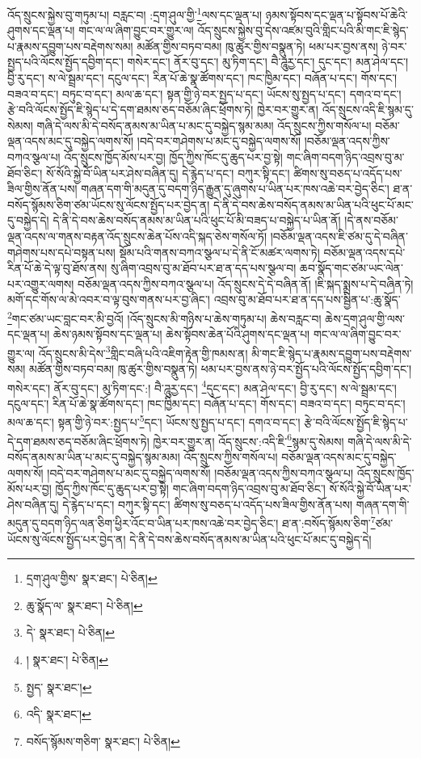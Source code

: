 འོད་སྲུངས་སྐྱེས་བུ་གཏུམ་པ། བརླང་བ། :དྲག་ཤུལ་གྱི་\footnote{དྲག་ཤུལ་གྱིས་  སྣར་ཐང་།  པེ་ཅིན། }ལས་དང་ལྡན་པ། ཉམས་སྟོབས་དང་ལྡན་པ་སྟོབས་པོ་ཆེའི་ཤུགས་དང་ལྡན་པ། གང་ལ་ལ་ཞིག་བྱུང་བར་གྱུར་ལ། འོད་སྲུངས་སྐྱེས་བུ་དེས་འཛམ་བུའི་གླིང་པའི་མི་གང་ཇི་སྙེད་པ་རྣམས་དབྱུག་པས་བརྡེགས་སམ། མཚོན་གྱིས་བཏབ་བམ། ཁུ་ཚུར་གྱིས་བསྣུན་ཏེ། ཕམ་པར་བྱས་ནས། ཉེ་བར་སྤྱད་པའི་ལོངས་སྤྱོད་དབྱིག་དང་། གསེར་དང་། ནོར་བུ་དང་། མུ་ཏིག་དང་། བཻ་ཌཱུརྱ་དང་། དུང་དང་། མན་ཤེལ་དང་། བྱི་རུ་དང་། ས་ལེ་སྦྲམ་དང་། དངུལ་དང་། རིན་པོ་ཆེ་སྣ་ཚོགས་དང་། ཁང་ཁྱིམ་དང་། བཞོན་པ་དང་། གོས་དང་། བཟའ་བ་དང་། བཏུང་བ་དང་། མལ་ཆ་དང་། སྟན་གྱི་ཉེ་བར་སྤྱད་པ་དང་། ཡོངས་སུ་སྤྱད་པ་དང་། དགའ་བ་དང་། རྩེ་བའི་ལོངས་སྤྱོད་ཇི་སྙེད་པ་དེ་དག་ཐམས་ཅད་བཅོམ་ཞིང་ཕྲོགས་ཏེ། ཁྱེར་བར་གྱུར་ན། འོད་སྲུངས་འདི་ཇི་སྙམ་དུ་སེམས། གཞི་དེ་ལས་མི་དེ་བསོད་ནམས་མ་ཡིན་པ་མང་དུ་བསྐྱེད་སྙམ་མམ། འོད་སྲུངས་ཀྱིས་གསོལ་པ། བཅོམ་ལྡན་འདས་མང་དུ་བསྐྱེད་ལགས་སོ། །བདེ་བར་གཤེགས་པ་མང་དུ་བསྐྱེད་ལགས་སོ། །བཅོམ་ལྡན་འདས་ཀྱིས་བཀའ་སྩལ་པ། འོད་སྲུངས་ཁྱོད་མོས་པར་བྱ། ཁྱོད་ཀྱིས་ཁོང་དུ་ཆུད་པར་བྱ་སྟེ། གང་ཞིག་བདག་ཉིད་འབྲས་བུ་མ་ཐོབ་ཅིང་། སོ་སོའི་སྐྱེ་བོ་ཡིན་པར་ཤེས་བཞིན་དུ། དེ་རྙེད་པ་དང་། བཀུར་སྟི་དང་། ཚིགས་སུ་བཅད་པ་འདོད་པས་ཟིལ་གྱིས་ནོན་པས། གཞན་དག་གི་མདུན་དུ་བདག་ཉིད་རྒྱུན་དུ་ཞུགས་པ་ཡིན་པར་ཁས་འཆེ་བར་བྱེད་ཅིང་། ཐ་ན་བསོད་སྙོམས་ཅིག་ཙམ་ཡོངས་སུ་ལོངས་སྤྱོད་པར་བྱེད་ན། དེ་ནི་དེ་བས་ཆེས་བསོད་ནམས་མ་ཡིན་པའི་ཕུང་པོ་མང་དུ་བསྐྱེད་དེ། དེ་ནི་དེ་བས་ཆེས་བསོད་ནམས་མ་ཡིན་པའི་ཕུང་པོ་མི་བཟད་པ་བསྐྱེད་པ་ཡིན་ནོ། །དེ་ནས་བཅོམ་ལྡན་འདས་ལ་གནས་བརྟན་འོད་སྲུངས་ཆེན་པོས་འདི་སྐད་ཅེས་གསོལ་ཏོ། །བཅོམ་ལྡན་འདས་ཇི་ཙམ་དུ་དེ་བཞིན་གཤེགས་པས་དཔེ་བསྟན་པས། སྡོམ་པའི་གནས་བཀའ་སྩལ་པ་དེ་ནི་ངོ་མཚར་ལགས་ཏེ། བཅོམ་ལྡན་འདས་དཔེ་རིན་པོ་ཆེ་དེ་ལྟ་བུ་ཐོས་ནས། སུ་ཞིག་འབྲས་བུ་མ་ཐོབ་པར་ཐ་ན་དད་པས་སྩལ་བ། ཆབ་སྣོད་གང་ཙམ་ཡང་ལེན་པར་འགྱུར་ལགས། བཅོམ་ལྡན་འདས་ཀྱིས་བཀའ་སྩལ་པ། འོད་སྲུངས་དེ་དེ་བཞིན་ནོ། །ཇི་སྐད་སྨྲས་པ་དེ་བཞིན་ཏེ། མགོ་དང་གོས་ལ་མེ་འབར་བ་ལྟ་བུས་གནས་པར་བྱ་ཞིང་། འབྲས་བུ་མ་ཐོབ་པར་ཐ་ན་དད་པས་སྦྱིན་པ་:ཆུ་སྣོད་\footnote{ཆུ་སྣོད་ལ་  སྣར་ཐང་།  པེ་ཅིན། }གང་ཙམ་ཡང་བླང་བར་མི་བྱའོ། །འོད་སྲུངས་མི་གཉིས་པ་ཆེས་གཏུམ་པ། ཆེས་བརླང་བ། ཆེས་དྲག་ཤུལ་གྱི་ལས་དང་ལྡན་པ། ཆེས་ཉམས་སྟོབས་དང་ལྡན་པ། ཆེས་སྟོབས་ཆེན་པོའི་ཤུགས་དང་ལྡན་པ། གང་ལ་ལ་ཞིག་བྱུང་བར་གྱུར་ལ། འོད་སྲུངས་མི་དེས་\footnote{དེ་  སྣར་ཐང་།  པེ་ཅིན། }གླིང་བཞི་པའི་འཇིག་རྟེན་གྱི་ཁམས་ན། མི་གང་ཇི་སྙེད་པ་རྣམས་དབྱུག་པས་བརྡེགས་སམ། མཚོན་གྱིས་བཏབ་བམ། ཁུ་ཚུར་གྱིས་བསྣུན་ཏེ། ཕམ་པར་བྱས་ནས་ཉེ་བར་སྤྱོད་པའི་ལོངས་སྤྱོད་དབྱིག་དང་། གསེར་དང་། ནོར་བུ་དང་། མུ་ཏིག་དང་:། བཻ་ཌཱུརྱ་དང་། \footnote{།    སྣར་ཐང་།  པེ་ཅིན། }དུང་དང་། མན་ཤེལ་དང་། བྱི་རུ་དང་། ས་ལེ་སྦྲམ་དང་། དངུལ་དང་། རིན་པོ་ཆེ་སྣ་ཚོགས་དང་། ཁང་ཁྱིམ་དང་། བཞོན་པ་དང་། གོས་དང་། བཟའ་བ་དང་། བཏུང་བ་དང་། མལ་ཆ་དང་། སྟན་གྱི་ཉེ་བར་:སྤྱད་པ་\footnote{སྤྱད་  སྣར་ཐང་། }དང་། ཡོངས་སུ་སྤྱད་པ་དང་། དགའ་བ་དང་། རྩེ་བའི་ལོངས་སྤྱོད་ཇི་སྙེད་པ་དེ་དག་ཐམས་ཅད་བཅོམ་ཞིང་ཕྲོགས་ཏེ། ཁྱེར་བར་གྱུར་ན། འོད་སྲུངས་:འདི་ཇི་\footnote{འདི་  སྣར་ཐང་། }སྙམ་དུ་སེམས། གཞི་དེ་ལས་མི་དེ་བསོད་ནམས་མ་ཡིན་པ་མང་དུ་བསྐྱེད་སྙམ་མམ། འོད་སྲུངས་ཀྱིས་གསོལ་པ། བཅོམ་ལྡན་འདས་མང་དུ་བསྐྱེད་ལགས་སོ། །བདེ་བར་གཤེགས་པ་མང་དུ་བསྐྱེད་ལགས་སོ། །བཅོམ་ལྡན་འདས་ཀྱིས་བཀའ་སྩལ་པ། འོད་སྲུངས་ཁྱོད་མོས་པར་བྱ། ཁྱོད་ཀྱིས་ཁོང་དུ་ཆུད་པར་བྱ་སྟེ། གང་ཞིག་བདག་ཉིད་འབྲས་བུ་མ་ཐོབ་ཅིང་། སོ་སོའི་སྐྱེ་བོ་ཡིན་པར་ཤེས་བཞིན་དུ། དེ་རྙེད་པ་དང་། བཀུར་སྟི་དང་། ཚིགས་སུ་བཅད་པ་འདོད་པས་ཟིལ་གྱིས་ནོན་པས། གཞན་དག་གི་མདུན་དུ་བདག་ཉིད་ལན་ཅིག་ཕྱིར་འོང་བ་ཡིན་པར་ཁས་འཆེ་བར་བྱེད་ཅིང་། ཐ་ན་:བསོད་སྙོམས་ཅིག་\footnote{བསོད་སྙོམས་གཅིག་  སྣར་ཐང་།  པེ་ཅིན། }ཙམ་ཡོངས་སུ་ལོངས་སྤྱོད་པར་བྱེད་ན། དེ་ནི་དེ་བས་ཆེས་བསོད་ནམས་མ་ཡིན་པའི་ཕུང་པོ་མང་དུ་བསྐྱེད་དེ། 